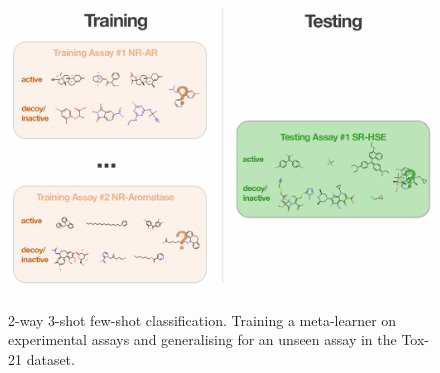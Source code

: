 \begin{figure}
    \centering
    \includegraphics[width=0.8\linewidth]{img/tox21-metalearning.png}
    \caption{2-way 3-shot few-shot classification. Training a meta-learner on experimental assays and generalising for an unseen assay in the Tox-21 dataset.}
    \label{fig:tox21metalearning}
\end{figure}

